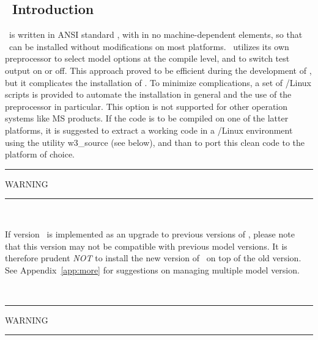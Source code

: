 \vssub
\subsection{~Introduction}
\vssub

\ws\ is written in ANSI standard , with in no machine-dependent
elements, so that \ws\ can be installed without modifications on most
platforms. \ws\ utilizes its own preprocessor to select model options at the
compile level, and to switch test output on or off. This approach proved to be
efficient during the development of \ws, but it complicates the installation
of \ws. To minimize complications, a set of \unix/Linux scripts is provided to
automate the installation in general and the use of the preprocessor in
particular. This option is not supported for other operation systems like MS
products. If the code is to be compiled on one of the latter platforms, it is
suggested to extract a working code in a \unix/Linux environment using the
utility {\code w3\_source} (see below), and than to port this clean code to
the platform of choice.

\begin{center}
\rule[1mm]{55mm}{1.0mm} WARNING \rule[1mm]{55mm}{1.0mm} \\ 
\vspace{\baselineskip}
\parbox{120mm}{If version \WWver\ is implemented as an upgrade to previous
versions of \ws, please note that this version may not be compatible with
previous model versions. It is therefore prudent {\it NOT} to install the new
version of \ws\ on top of the old version. See Appendix~\ref{app:more} for
suggestions on managing multiple model version.} \\ \vspace{\baselineskip}
\rule[1mm]{55mm}{1.0mm} WARNING \rule[1mm]{55mm}{1.0mm}
\end{center}
